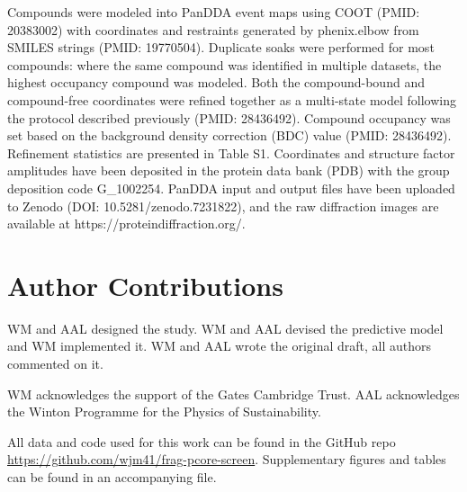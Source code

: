 Compounds were modeled into PanDDA event maps using COOT (PMID: 20383002) with coordinates and restraints generated by phenix.elbow from SMILES strings (PMID: 19770504). Duplicate soaks were performed for most compounds: where the same compound was identified in multiple datasets, the highest occupancy compound was modeled. Both the compound-bound and compound-free coordinates were refined together as a multi-state model following the protocol described previously (PMID: 28436492). Compound occupancy was set based on the background density correction (BDC) value (PMID: 28436492). Refinement statistics are presented in Table S1. Coordinates and structure factor amplitudes have been deposited in the protein data bank (PDB) with the group deposition code G\_1002254. PanDDA input and output files have been uploaded to Zenodo (DOI: 10.5281/zenodo.7231822), and the raw diffraction images are available at https://proteindiffraction.org/.

\section{Author Contributions}
WM and AAL designed the study. WM and AAL devised the predictive model and WM implemented it. WM and AAL wrote the original draft, all authors commented on it.

WM acknowledges the support of the Gates Cambridge Trust. AAL acknowledges the Winton Programme for the Physics of Sustainability.

All data and code used for this work can be found in the GitHub repo \url{https://github.com/wjm41/frag-pcore-screen}. Supplementary figures and tables can be found in an accompanying file.